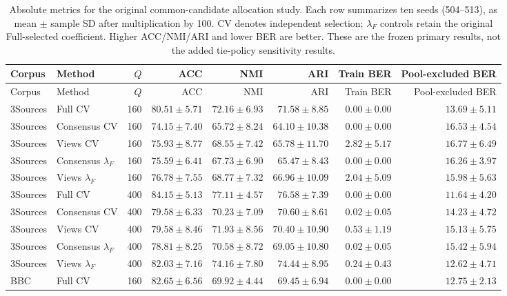 \begingroup\small
\setlength{\tabcolsep}{3pt}
\begin{longtable}{llrrrrrr}
\caption{Absolute metrics for the original common-candidate allocation study. Each row summarizes ten seeds (504--513), as mean $\pm$ sample SD after multiplication by 100. CV denotes independent selection; $\lambda_F$ controls retain the original Full-selected coefficient. Higher ACC/NMI/ARI and lower BER are better. These are the frozen primary results, not the added tie-policy sensitivity results.}\label{tab:allocation-primary-absolute}\\
\toprule
Corpus & Method & $Q$ & ACC & NMI & ARI & Train BER & Pool-excluded BER\\
\midrule\endfirsthead
\toprule
Corpus & Method & $Q$ & ACC & NMI & ARI & Train BER & Pool-excluded BER\\
\midrule\endhead
\bottomrule\endfoot
3Sources & Full CV & 160 & $80.51\pm5.71$ & $72.16\pm6.93$ & $71.58\pm8.85$ & $0.00\pm0.00$ & $13.69\pm5.11$\\
3Sources & Consensus CV & 160 & $74.15\pm7.40$ & $65.72\pm8.24$ & $64.10\pm10.38$ & $0.00\pm0.00$ & $16.53\pm4.54$\\
3Sources & Views CV & 160 & $75.93\pm8.77$ & $68.55\pm7.42$ & $65.78\pm11.70$ & $2.82\pm5.17$ & $16.77\pm6.49$\\
3Sources & Consensus $\lambda_F$ & 160 & $75.59\pm6.41$ & $67.73\pm6.90$ & $65.47\pm8.43$ & $0.00\pm0.00$ & $16.26\pm3.97$\\
3Sources & Views $\lambda_F$ & 160 & $76.78\pm7.55$ & $68.77\pm7.32$ & $66.96\pm10.09$ & $2.04\pm5.09$ & $15.98\pm5.63$\\
3Sources & Full CV & 400 & $84.15\pm5.13$ & $77.11\pm4.57$ & $76.58\pm7.39$ & $0.00\pm0.00$ & $11.64\pm4.20$\\
3Sources & Consensus CV & 400 & $79.58\pm6.33$ & $70.23\pm7.09$ & $70.60\pm8.61$ & $0.02\pm0.05$ & $14.23\pm4.72$\\
3Sources & Views CV & 400 & $79.58\pm8.46$ & $71.93\pm8.56$ & $70.40\pm10.90$ & $0.53\pm1.19$ & $15.13\pm5.75$\\
3Sources & Consensus $\lambda_F$ & 400 & $78.81\pm8.25$ & $70.58\pm8.72$ & $69.05\pm10.80$ & $0.02\pm0.05$ & $15.42\pm5.94$\\
3Sources & Views $\lambda_F$ & 400 & $82.03\pm7.16$ & $74.16\pm7.80$ & $74.44\pm8.95$ & $0.24\pm0.43$ & $12.62\pm4.71$\\
BBC & Full CV & 160 & $82.65\pm6.56$ & $69.92\pm4.44$ & $69.45\pm6.94$ & $0.00\pm0.00$ & $12.75\pm2.13$\\

\end{longtable}
